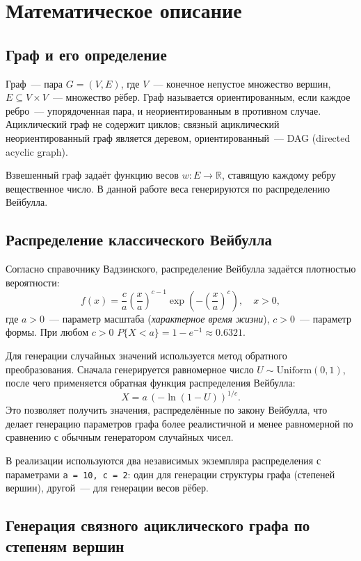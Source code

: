 \section{Математическое описание}

\subsection{Граф и его определение}

Граф~--- пара $G = (V, E)$, где $V$~--- конечное непустое множество вершин,
$E \subseteq V \times V$~--- множество рёбер. Граф называется ориентированным,
если каждое ребро~--- упорядоченная пара, и неориентированным в противном
случае. Ациклический граф не содержит циклов; связный ациклический
неориентированный граф является деревом, ориентированный~--- DAG
(directed acyclic graph).

Взвешенный граф задаёт функцию весов $w : E \to \mathbb{R}$, ставящую
каждому ребру вещественное число. В данной работе веса генерируются
по распределению Вейбулла.

\subsection{Распределение классического Вейбулла}

Согласно справочнику Вадзинского, распределение Вейбулла задаётся
плотностью вероятности:
\[
f(x) = \frac{c}{a} \left(\frac{x}{a}\right)^{c-1}
        \exp\!\left(-\left(\frac{x}{a}\right)^c\right), \quad x > 0,
\]
где $a > 0$~--- параметр масштаба (\textit{характерное время жизни}),
$c > 0$~--- параметр формы. При любом $c > 0$
$P\{X < a\} = 1 - e^{-1} \approx 0.6321$.

Для генерации случайных значений используется метод обратного преобразования.
Сначала генерируется равномерное число $U \sim \mathrm{Uniform}(0,1)$,
после чего применяется обратная функция распределения Вейбулла:
\[
X = a\,(-\ln(1 - U))^{1/c}.
\]
Это позволяет получить значения, распределённые по закону Вейбулла, что
делает генерацию параметров графа более реалистичной и менее равномерной
по сравнению с обычным генератором случайных чисел.

В реализации используются два независимых экземпляра распределения
с параметрами \texttt{a = 10, c = 2}: один для генерации структуры графа
(степеней вершин), другой~--- для генерации весов рёбер.

\subsection{Генерация связного ациклического графа по степеням вершин}

